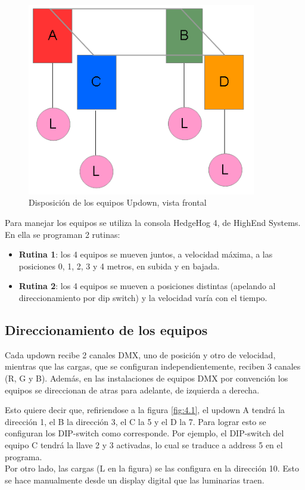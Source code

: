 \begin{figure}[!ht]
	\centering
	\includegraphics[width=10cm,scale=1]{resources/4_1-disposicionUpdowns.png}
	\caption{Disposición de los equipos Updown, vista frontal}
	\label{fig:\thefigure}
\end{figure}

Para manejar los equipos se utiliza la consola HedgeHog 4, de HighEnd Systems. En ella se programan 2 rutinas:
\begin{itemize}
	\item \textbf{Rutina 1}: los 4 equipos se mueven juntos, a velocidad máxima, a las posiciones 0, 1, 2, 3 y 4 metros, en subida y en bajada.
	\item \textbf{Rutina 2}: los 4 equipos se mueven a posiciones distintas (apelando al direccionamiento por dip switch) y la velocidad varía con el tiempo.
\end{itemize}

\subsection{Direccionamiento de los equipos}
Cada updown recibe 2 canales DMX, uno de posición y otro de velocidad, mientras que las cargas, que se configuran independientemente, reciben 3 canales (R, G y B). Además, en las instalaciones de equipos DMX por convención los equipos se direccionan de atras para adelante, de izquierda a derecha.

Esto quiere decir que, refiriendose a la figura \ref{fig:4.1}, el updown A tendrá la dirección 1, el B la dirección 3, el C la 5 y el D la 7. Para lograr esto se configuran los DIP-switch como corresponde. Por ejemplo, el DIP-switch del equipo C tendrá la llave 2 y 3 activadas, lo cual se traduce a address 5 en el programa.\\
Por otro lado, las cargas (L en la figura) se las configura en la dirección 10. Esto se hace manualmente desde un display digital que las luminarias traen. 

